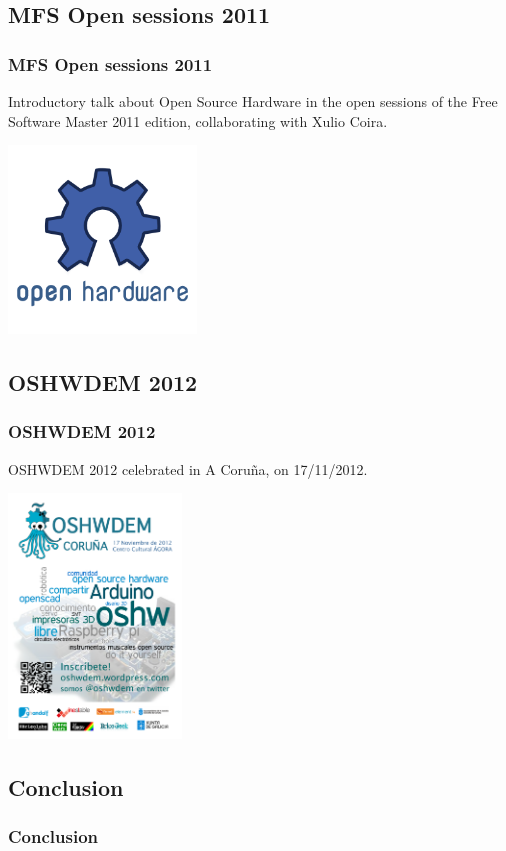 \documentclass[slidestop,compress,mathserif]{beamer}
\begin{document}
\subsection{MFS Open sessions 2011}
\begin{frame}
  \frametitle{MFS Open sessions 2011}
  Introductory talk about Open Source Hardware in the open sessions of the Free Software Master 2011 edition, collaborating with Xulio Coira.

  \begin{center}
    \includegraphics[height=5cm]{images/ohw-logo.png}
  \end{center}

\end{frame}

\subsection{OSHWDEM 2012}
\begin{frame}
  \frametitle{OSHWDEM 2012}
  OSHWDEM 2012 celebrated in A Coru\~na, on 17/11/2012.

  \begin{center}
    \includegraphics[height=6.5cm]{images/cartel-oshwdem5-300.png}
  \end{center}

\end{frame}

\subsection{Conclusion}
\begin{frame}
  \frametitle{Conclusion}

\end{frame}
\end{document}
